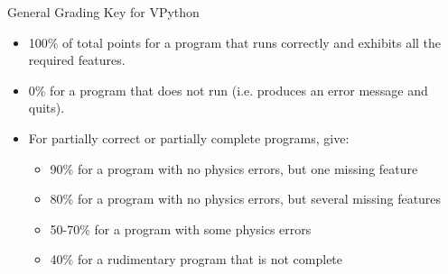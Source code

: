 \documentclass[11pt]{article}
\begin{document}
\begin{noindent}
\begin{flushleft}
\begin{description}
\item[General Grading Key for VPython] 
\end{description}
\begin{itemize}
\item 100\% of total points for a program that runs correctly and exhibits all the required features.
\item 0\% for a program that does not run (i.e. produces an error message and quits).
\item For partially correct or partially complete programs, give:
\begin{itemize}
\item 90\% for a program with no physics errors, but one missing feature
\item 80\% for a program with no physics errors, but several missing features
\item 50-70\% for a program with some physics errors
\item 40\% for a rudimentary program that is not complete
\end{itemize}
\end{itemize}

\end{flushleft}
\end{noindent}
\end{document}
